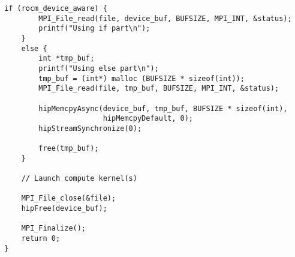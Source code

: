 \begin{example}
\begin{lstlisting}[language={[MPI]C}]
    if (rocm_device_aware) {
        MPI_File_read(file, device_buf, BUFSIZE, MPI_INT, &status);
        printf("Using if part\n");
    }
    else {
        int *tmp_buf;
        printf("Using else part\n");
        tmp_buf = (int*) malloc (BUFSIZE * sizeof(int));
        MPI_File_read(file, tmp_buf, BUFSIZE, MPI_INT, &status);

        hipMemcpyAsync(device_buf, tmp_buf, BUFSIZE * sizeof(int),
                       hipMemcpyDefault, 0);
        hipStreamSynchronize(0);

        free(tmp_buf);
    }

    // Launch compute kernel(s)

    MPI_File_close(&file);
    hipFree(device_buf);

    MPI_Finalize();
    return 0;
}
\end{lstlisting}
\end{example}
